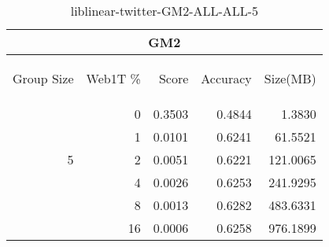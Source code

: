 \begin{center}
\begin{table}[htbp]
\begin{tabular}{ | r | r | r | r | r |}
\hline
\multicolumn{5}{|c|}{GM2}\\
\hline
\begin{sideways}Group Size\end{sideways} & \begin{sideways}Web1T \%\end{sideways} & \begin{sideways}Score\end{sideways} & \begin{sideways}Accuracy\end{sideways} & \begin{sideways}Size(MB)\end{sideways}\\
\hline
\multirow{5}{*}{5}
 & 0 & 0.3503 & 0.4844 & 1.3830\\ \cline{2-5}
 & 1 & 0.0101 & 0.6241 & 61.5521\\ \cline{2-5}
 & 2 & 0.0051 & 0.6221 & 121.0065\\ \cline{2-5}
 & 4 & 0.0026 & 0.6253 & 241.9295\\ \cline{2-5}
 & 8 & 0.0013 & 0.6282 & 483.6331\\ \cline{2-5}
 & 16 & 0.0006 & 0.6258 & 976.1899\\ \cline{2-5}
\hline
\end{tabular}
\caption{liblinear-twitter-GM2-ALL-ALL-5}
\label{table:liblinear-twitter-GM2-ALL-ALL-5}
\end{table}
\end{center}

